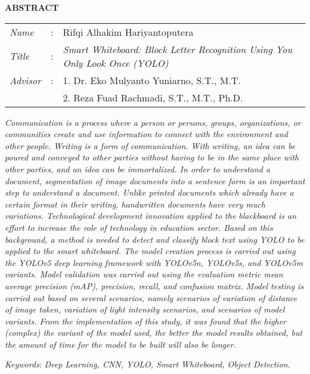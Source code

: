 \begin{center}
  \large\textbf{ABSTRACT}
\end{center}


\vspace{2ex}

\begingroup
  \setlength{\tabcolsep}{0pt}

  \noindent
  \begin{tabularx}{\textwidth}{l >{\centering}m{3em} X}
    \emph{Name}     &:& Rifqi Alhakim Hariyantoputera \\

    \emph{Title}    &:& \textit{Smart Whiteboard: Block Letter Recognition Using You Only Look Once (YOLO)} \\

    \textit{Advisor}  &:& 1. Dr. Eko Mulyanto Yuniarno, S.T., M.T. \\
                      & & 2. Reza Fuad Rachmadi, S.T., M.T., Ph.D. \\
  \end{tabularx}
\endgroup

\textit{Communication is a process where a person or persons, groups, organizations, or communities create and use information to connect with the environment and other people. Writing is a form of communication. With writing, an idea can be poured and conveyed to other parties without having to be in the same place with other parties, and an idea can be immortalized. 
In order to understand a document, segmentation of image documents into a sentence form is an important step to understand a document. Unlike printed documents which already have a certain format in their writing, handwritten documents have very much variations. Technological development innovation applied to the blackboard is an effort to increase the role of technology in education sector. Based on this background, a method is needed to detect and classify block text using YOLO to be applied to the smart whiteboard. The model creation process is carried out using the YOLOv5 deep learning framework with YOLOv5n, YOLOv5s, and YOLOv5m variants. Model validation was carried out using the evaluation metric mean average precision (mAP), precision, recall, and confusion matrix. Model testing is carried out based on several scenarios, namely scenarios of variation of distance of image taken, variation of light intensity scenarios, and scenarios of model variants. From the implementation of this study, it was found that the higher (complex) the variant of the model used, the better the model results obtained, but the amount of time for the model to be built will also be longer.}

\textit{Keywords}: \textit{Deep Learning, CNN, YOLO, Smart Whiteboard, Object Detection}.
